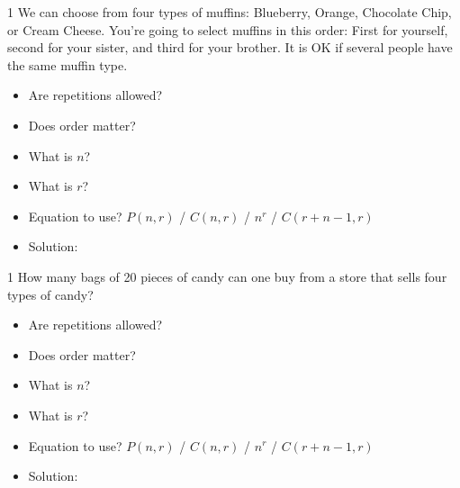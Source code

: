 \documentclass[a4paper,12pt]{book}
\newcounter{question}
\begin{document}
        \begin{question}{\thequestion}{1}
            We can choose from four types of muffins:
            Blueberry, Orange, Chocolate Chip, or Cream Cheese.
            You're going to select muffins in this order:
            First for yourself, second for your sister,
            and third for your brother.
            It is OK if several people have the same muffin type.

            \begin{itemize}
                \item[]     Are repetitions allowed?    
                \item[]     Does order matter?          
                \item[]     What is $n$?                
                \item[]     What is $r$?                
                \item[]     Equation to use? $P(n,r)$ / $C(n,r)$ / $n^{r}$ / $C(r+n-1,r)$            
                \item[]     Solution: 
            \end{itemize}
        \end{question}

        \hrulefill

        \begin{question}{\thequestion}{1}
            How many bags of 20 pieces of candy can one buy
            from a store that sells four types of candy?

            \begin{itemize}
                \item[]     Are repetitions allowed?    
                \item[]     Does order matter?          
                \item[]     What is $n$?                
                \item[]     What is $r$?                
                \item[]     Equation to use? $P(n,r)$ / $C(n,r)$ / $n^{r}$ / $C(r+n-1,r)$            
                \item[]     Solution: 
            \end{itemize}
        \end{question}
\end{document}
